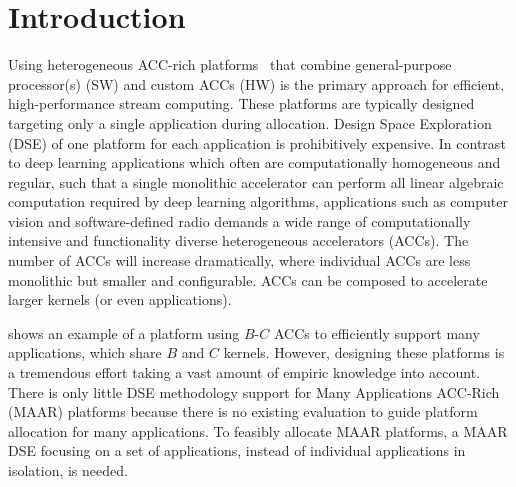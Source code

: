 \vspace{-3pt}
\section{Introduction}
\label{sec:introduction}



Using heterogeneous ACC-rich platforms~\cite{melpignano2012platform} that combine general-purpose processor(s) (SW) and custom ACCs (HW) is the primary approach for efficient, high-performance stream computing.
These platforms are typically designed targeting only a single application during allocation. Design Space Exploration (DSE) of one platform for each application is prohibitively expensive. In contrast to deep learning applications which often are computationally homogeneous and regular, such that a single monolithic accelerator can perform all linear algebraic computation required by deep learning algorithms, applications such as computer vision and software-defined radio demands a wide range of computationally intensive and functionality diverse heterogeneous accelerators (ACCs). The number of ACCs will increase dramatically, where individual ACCs are less monolithic but smaller and configurable. ACCs can be composed to accelerate larger kernels (or even applications).

 shows an example of a platform using $B$-$C$ ACCs to efficiently support many applications, which share $B$ and $C$ kernels. 
However, designing these platforms is a tremendous effort taking a vast amount of empiric knowledge into account. There is only little DSE methodology support for Many Applications ACC-Rich (MAAR) platforms because there is no existing evaluation to guide platform allocation for many applications. To feasibly allocate MAAR platforms, a MAAR DSE focusing on a set of applications, instead of individual applications in isolation, is needed.

